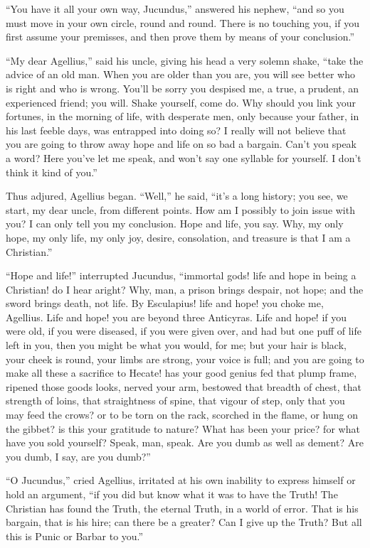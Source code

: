 ``You have it all your own way, Jucundus,'' answered his
nephew, ``and so you must move in your own circle, round and
round. There is no touching you, if you first assume your premisses,
and then prove them by means of your conclusion.''

``My dear Agellius,'' said his uncle, giving his head a
very solemn shake, ``take the advice of an old man. When you are
older than you are, you will see better who is right and who is wrong.
You'll be sorry you despised me, a true, a prudent, an experienced
friend; you will. Shake yourself, come do. Why should you link your
fortunes, in the morning of life, with desperate men, only because
your father, in his last feeble days, was entrapped into doing so? I
really will not believe that you are going to throw away hope and life
on so bad a bargain. Can't you speak a word? Here you've let me speak,
and won't say one syllable for yourself. I don't think it kind of
you.''

Thus adjured, Agellius began. ``Well,'' he said, ``it's a long history; you see, we start, my dear uncle, from
different points. How am I possibly to join issue with you? I can only
tell you my conclusion. Hope and life, you say. Why, my only hope, my
only life, my only joy, desire, consolation, and treasure is that I am
a Christian.''

``Hope and life!'' interrupted Jucundus, ``immortal
gods! life and hope in being a Christian! do I hear aright? Why, man,
a prison brings despair, not hope; and the sword brings death, not
life. By Esculapius! life and hope! you choke me, Agellius. Life and
hope! you are beyond three Anticyras. Life and hope! if you were old,
if you were diseased, if you were given over, and had but one puff of
life left in you, then you might be what you would, for me; but your
hair is black, your cheek is round, your limbs are strong, your voice
is full; and you are going to make all these a sacrifice to Hecate!
has your good genius fed that plump frame, ripened those goods looks,
nerved your arm, bestowed that breadth of chest, that strength of
loins, that straightness of spine, that vigour of step, only that you
may feed the crows? or to be torn on the rack, scorched in the flame,
or hung on the gibbet? is this your gratitude to nature? What has been
your price? for what have you sold yourself? Speak, man, speak. Are
you dumb as well as dement? Are you dumb, I say, are you dumb?''

``O Jucundus,'' cried Agellius, irritated at his own
inability to express himself or hold an argument, ``if you did but
know what it was to have the Truth! The Christian has found the
Truth, the eternal Truth, in a world of error. That is his bargain,
that is his hire; can there be a greater? Can I give up the Truth? But
all this is Punic or Barbar to you.''

